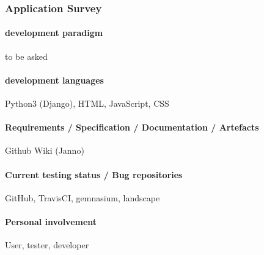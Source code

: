 \subsubsection{Application Survey}

\paragraph{development paradigm}

to be asked

\paragraph{development languages}

Python3 (Django), HTML, JavaScript, CSS

\paragraph{Requirements / Specification / Documentation / Artefacts}
Github Wiki
(Janno)

\paragraph{Current testing status / Bug repositories}

GitHub, TravisCI, gemnasium, landscape

\paragraph{Personal involvement}

User, tester, developer
